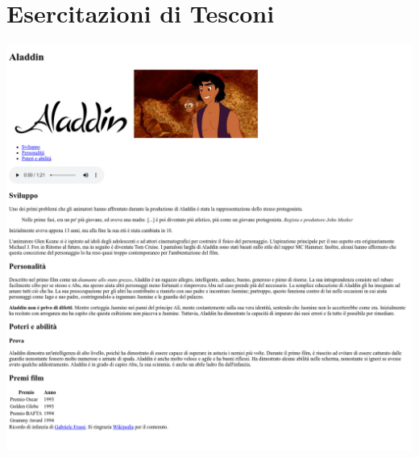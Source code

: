 \documentclass[11pt]{report}
\begin{document}
\part{Esercitazioni di Tesconi}



\begin{center}
\includegraphics[scale=0.4]{img/8.PNG}
\end{center}


\end{document}
